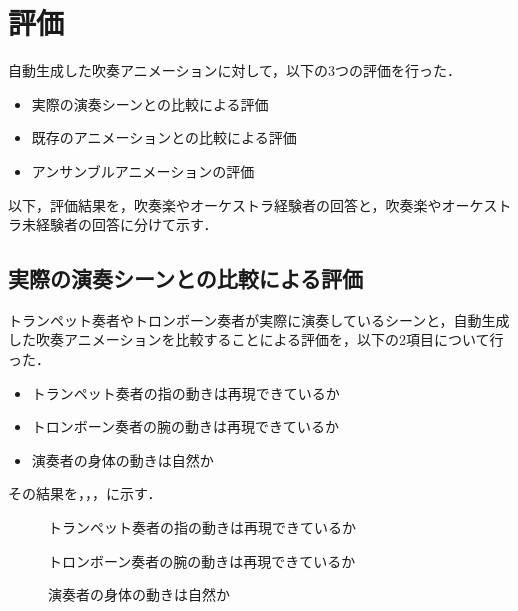 \section{評価} \label{sec:review}
自動生成した吹奏アニメーションに対して，以下の3つの評価を行った．
\begin{itemize}
	\item 実際の演奏シーンとの比較による評価
	\item 既存のアニメーションとの比較による評価
	\item アンサンブルアニメーションの評価
\end{itemize}
以下，評価結果を，吹奏楽やオーケストラ経験者の回答と，吹奏楽やオーケストラ未経験者の回答に分けて示す．

\subsection{実際の演奏シーンとの比較による評価}
トランペット奏者やトロンボーン奏者が実際に演奏しているシーンと，自動生成した吹奏アニメーションを比較することによる評価を，以下の2項目について行った．
\begin{itemize}
	\item トランペット奏者の指の動きは再現できているか
	\item トロンボーン奏者の腕の動きは再現できているか
	\item 演奏者の身体の動きは自然か
\end{itemize}
その結果を，，，に示す．
\begin{figure}[!h]
	\centering
	\hspace{2mm}
	\caption{トランペット奏者の指の動きは再現できているか}
	\label{fig:Q1-tp}
\end{figure}
\begin{figure}[!h]
	\centering
	\caption{トロンボーン奏者の腕の動きは再現できているか}
	\label{fig:Q1-tb}
\end{figure}
\begin{figure}[!h]
	\centering
	\caption{演奏者の身体の動きは自然か}
	\label{fig:Q1-tptb}
\end{figure}

